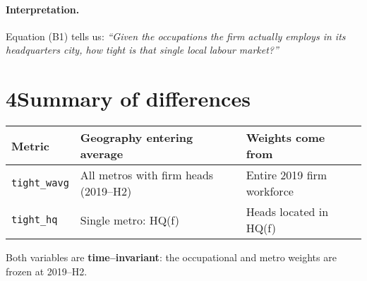 \documentclass[11pt]{article}
\begin{document}
\paragraph{Interpretation.}  Equation (B1) tells us: \emph{“Given the
occupations the firm actually employs in its headquarters city, how
tight is that single local labour market?”}

\section*{4\quad Summary of differences}

\begin{center}
\begin{tabular}{@{}lll@{}}
\toprule
Metric           & Geography entering average        & Weights come from               \\
\midrule
\texttt{tight\_wavg} & All metros with firm heads (2019--H2) & Entire 2019 firm workforce       \\
\texttt{tight\_hq}   & Single metro: HQ(f)                   & Heads located in HQ(f)           \\
\bottomrule
\end{tabular}
\end{center}

Both variables are \textbf{time–invariant}: the occupational and metro
weights are frozen at 2019--H2.
\end{document}
